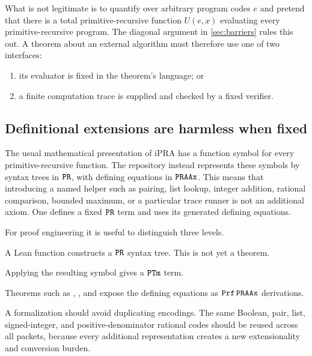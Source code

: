 What is not legitimate is to quantify over arbitrary program codes \(e\) and
pretend that there is a total primitive-recursive function
\(U(e,x)\) evaluating every primitive-recursive program.  The diagonal
argument in \cref{sec:barriers} rules this out.  A theorem about an external
algorithm must therefore use one of two interfaces:

\begin{enumerate}
\item its evaluator is fixed in the theorem's language; or
\item a finite computation trace is supplied and checked by a fixed verifier.
\end{enumerate}

\subsection{Definitional extensions are harmless when fixed}

The usual mathematical presentation of iPRA has a function symbol for every
primitive-recursive function.  The repository instead represents these
symbols by syntax trees in \(\texttt{PR}\), with defining equations in \(\texttt{PRAAx}\).
This means that introducing a named helper such as pairing, list lookup,
integer addition, rational comparison, bounded maximum, or a particular trace
runner is not an additional axiom.  One defines a fixed \(\texttt{PR}\) term and uses
its generated defining equations.

For proof engineering it is useful to distinguish three levels.

\begin{description}[leftmargin=3.2cm,style=nextline]
\item[Meta-level definition.] A Lean function constructs a \(\texttt{PR}\) syntax
      tree.  This is not yet a theorem.
\item[Object term.] Applying the resulting symbol gives a \(\texttt{PTm}\) term.
\item[Object proof.] Theorems such as , ,
      and  expose the defining equations as
      \(\texttt{Prf}\,\texttt{PRAAx}\) derivations.
\end{description}

A formalization should avoid duplicating encodings.  The same Boolean, pair,
list, signed-integer, and positive-denominator rational codes should be reused
across all packets, because every additional representation creates a new
extensionality and conversion burden.

